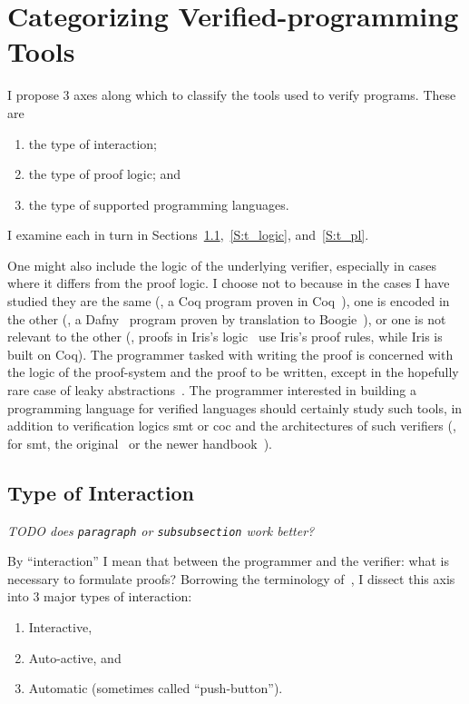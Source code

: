 \section{Categorizing Verified-programming Tools}\label{S:categories}

I propose 3 axes along which to classify the tools used to verify programs.
These are
\begin{enumerate}
    \item the type of interaction;
    \item the type of proof logic; and
    \item the type of supported programming languages.
\end{enumerate}

I examine each in turn in Sections~\ref{S:t_interaction},~\ref{S:t_logic},
and~\ref{S:t_pl}.

One might also include the logic of the underlying verifier, especially in cases
where it differs from the proof logic. I choose not to because in the cases I
have studied they are the same (\eg, a Coq program proven in Coq~\cite{Coq}),
one is encoded in the other (\eg, a Dafny~\cite{leino2010dafny} program proven
by translation to Boogie~\cite{Barnett_2006,leino2008this}), or one is not
relevant to the other (\eg, proofs in Iris's logic~\cite{Jung_2018b} use Iris's
proof rules, while Iris is built on Coq). The programmer tasked with writing the
proof is concerned with the logic of the proof-system and the proof to be
written, except in the hopefully rare case of leaky
abstractions~\cite{Spolsky_2002}. The programmer interested in building a
programming language for verified languages should certainly study such tools,
in addition to verification logics \gls{smt} or \gls{coc} and the architectures
of such verifiers (\eg, for \gls{smt}, the original~\cite{Davis_1960,Davis_1962}
or the newer handbook~\cite{biere2009handbook}).

\subsection{Type of Interaction}\label{S:t_interaction}

\emph{TODO does \texttt{paragraph} or \texttt{subsubsection} work better?}

By ``interaction'' I mean that between the programmer and the verifier: what is
necessary to formulate proofs? Borrowing the terminology of~\cite[\S 2]{Nelson_2019},
I dissect this axis into 3 major types of interaction:
\begin{enumerate}
    \item Interactive,
    \item Auto-active, and
    \item Automatic (sometimes called ``push-button'').
\end{enumerate}

